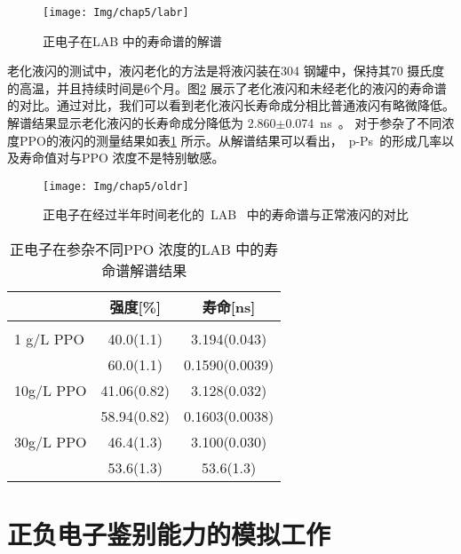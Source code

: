\begin{figure}[!htbp]
  \centering
   \texttt{[image: Img/chap5/labr]}
    \caption{正电子在LAB 中的寿命谱的解谱}
  \label{fig:labs}
\end{figure}
老化液闪的测试中，液闪老化的方法是将液闪装在304 钢罐中，保持其70 摄氏度的高温，并且持续时间是6个月。图\ref{fig:oldrf} 展示了老化液闪和未经老化的液闪的寿命谱的对比。通过对比，我们可以看到老化液闪长寿命成分相比普通液闪有略微降低。解谱结果显示老化液闪的长寿命成分降低为 2.860$\pm$0.074~ns~。 对于参杂了不同浓度PPO的液闪的测量结果如表\ref{tab:ppo} 所示。从解谱结果可以看出，~p-Ps~的形成几率以及寿命值对与PPO 浓度不是特别敏感。
\begin{figure}[!htbp]
  \centering
   \texttt{[image: Img/chap5/oldr]}
    \caption{正电子在经过半年时间老化的~LAB~ 中的寿命谱与正常液闪的对比}
  \label{fig:oldrf}
\end{figure}

\begin{table}[htbp]
\centering  %
\begin{tabular}{lcc}  %
\hline
&强度[\%]&寿命[ns] \\ \hline  %
\\ 1 g/L PPO &40.0(1.1)  & 3.194(0.043) %
\\ & 60.0(1.1) &0.1590(0.0039)
\\ 10g/L PPO&41.06(0.82)               & 3.128(0.032)                            %
\\  &58.94(0.82)               &0.1603(0.0038)
\\  30g/L PPO&46.4(1.3)                 &3.100(0.030)
\\  & 53.6(1.3)                &53.6(1.3)
\\ \hline
\end{tabular}
\caption{正电子在参杂不同PPO 浓度的LAB 中的寿命谱解谱结果}
\label{tab:ppo}
\end{table}

\section{正负电子鉴别能力的模拟工作}
